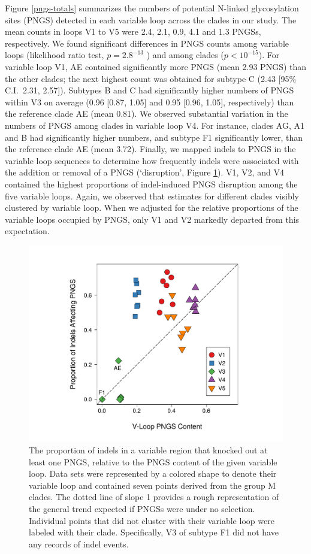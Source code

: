 \documentclass[12pt]{article}
\newcommand{\todo}[2]{\hl{\textbf{#1:} #2}}
\begin{document}
Figure \ref{pngs-totals} summarizes the numbers of potential N-linked glycosylation sites (PNGS) detected in each variable loop across the clades in our study.
The mean counts in loops V1 to V5 were 2.4, 2.1, 0.9, 4.1 and 1.3 PNGSs, respectively.
We found significant differences in PNGS counts among variable loops (likelihood ratio test, $p=2.8^{-13}$ ) and among clades ($p <10^{-15}$).
For variable loop V1, AE contained significantly more PNGS (mean 2.93 PNGS) than the other clades; the next highest count was obtained for subtype C (2.43 [95\% C.I.~2.31, 2.57]).
Subtypes B and C had significantly higher numbers of PNGS within V3 on average (0.96 [0.87, 1.05] and 0.95 [0.96, 1.05], respectively) than the reference clade AE (mean 0.81).
We observed substantial variation in the numbers of PNGS among clades in variable loop V4.
For instance, clades AG, A1 and B had significantly higher numbers, and subtype F1 significantly lower, than the reference clade AE (mean 3.72).
Finally, we mapped indels to PNGS in the variable loop sequences to determine how frequently indels were associated with the addition or removal of a PNGS (`disruption', Figure \ref{indel-disrupt}). 
V1, V2, and V4 contained the highest proportions of indel-induced PNGS disruption among the five variable loops.
Again, we observed that estimates for different clades visibly clustered by variable loop.
When we adjusted for the relative proportions of the variable loops occupied by PNGS, only V1 and V2 markedly departed from this expectation.


\begin{figure}
    \centering
	\includegraphics[width=.7\textwidth,trim={35mm 10mm 15mm 10mm}, clip]{indel-disrupt}
    \caption{
    The proportion of indels in a variable region that knocked out at least one PNGS, relative to the PNGS content of the given variable loop. 
    Data sets were represented by a colored shape to denote their variable loop and contained seven points derived from the group M clades.
    The dotted line of slope 1 provides a rough representation of the general trend expected if PNGSs were under no selection.    
    Individual points that did not cluster with their variable loop were labeled with their clade. 
    Specifically, V3 of subtype F1 did not have any records of indel events. 
    }
    \label{indel-disrupt}
\end{figure}
\end{document}
